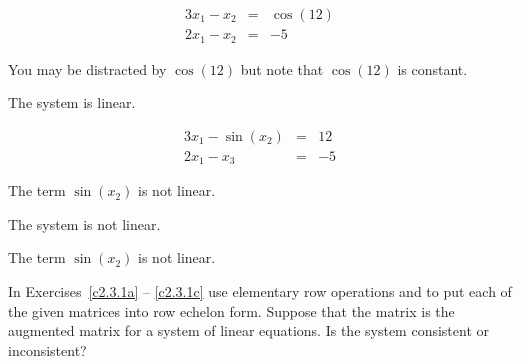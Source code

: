 \documentclass{ximera}
\begin{document}
\begin{exercise} \label{c2.3.12d}
\[
\begin{array}{rcl}
3x_1  -x_2  & = & \cos(12)\\
2x_1 -   x_2    & = & -5
\end{array}
\]
\begin{multipleChoice}
\end{multipleChoice}
\begin{hint}
  You may be distracted by $\cos(12)$ but note that $\cos(12)$ is constant.
\end{hint}

\begin{solution}
\ans The system is linear.

\end{solution}
\end{exercise}
\begin{exercise} \label{c2.3.12e}
\[
\begin{array}{rcl}
3x_1  - \sin(x_2)  & = & 12\\
2x_1 -   x_3    & = & -5
\end{array}
\]
\begin{multipleChoice}
\end{multipleChoice}
\begin{hint}
  The term $\sin(x_2)$ is not linear.
\end{hint}

\begin{solution}
\ans The system is not linear.

\soln The term $\sin(x_2)$ is not linear.


\end{solution}
\end{exercise}

\CEXER



\noindent In Exercises~\ref{c2.3.1a} -- \ref{c2.3.1c} use elementary row
operations and \Matlab to put each of the given matrices into row echelon
form.  Suppose that the matrix is the augmented matrix for a system of
linear equations.  Is the system consistent or inconsistent?
\end{document}
